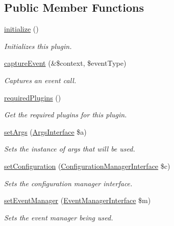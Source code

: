 \subsection*{Public Member Functions}
\begin{DoxyCompactItemize}
\item 
\hyperlink{classHttpConfigurationPlugin_aa6aa5682122768f930b206cc2a969760}{initialize} ()
\begin{DoxyCompactList}\small\item\em Initializes this plugin. \end{DoxyCompactList}\item 
\hyperlink{classHttpConfigurationPlugin_a6dd1ab58f483a382282f085204423648}{capture\-Event} (\&\$context, \$event\-Type)
\begin{DoxyCompactList}\small\item\em Captures an event call. \end{DoxyCompactList}\item 
\hyperlink{classHttpConfigurationPlugin_af4d95bc2fad0a9efa10beb1b5367c689}{required\-Plugins} ()
\begin{DoxyCompactList}\small\item\em Get the required plugins for this plugin. \end{DoxyCompactList}\item 
\hyperlink{classGenericPlugin_abf0b12b47909ef3c4dada146ea775526}{set\-Args} (\hyperlink{interfaceArgsInterface}{Args\-Interface} \$a)
\begin{DoxyCompactList}\small\item\em Sets the instance of args that will be used. \end{DoxyCompactList}\item 
\hyperlink{classGenericPlugin_a009c5398920a9672a2f13af38756fd5f}{set\-Configuration} (\hyperlink{interfaceConfigurationManagerInterface}{Configuration\-Manager\-Interface} \$c)
\begin{DoxyCompactList}\small\item\em Sets the configuration manager interface. \end{DoxyCompactList}\item 
\hyperlink{classGenericPlugin_afc683b68f471d89aa6a95daebcbfe28a}{set\-Event\-Manager} (\hyperlink{interfaceEventManagerInterface}{Event\-Manager\-Interface} \$m)
\begin{DoxyCompactList}\small\item\em Sets the event manager being used. \end{DoxyCompactList}\item 

\end{DoxyCompactItemize}
